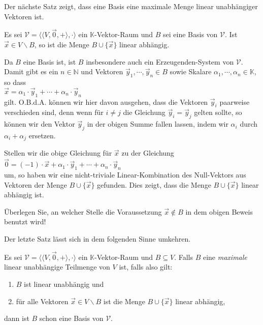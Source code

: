 \noindent
Der n\"{a}chste Satz zeigt, dass eine Basis eine {\color{red}maximale} Menge linear unabh\"{a}ngiger Vektoren ist.

\begin{Satz}
  Es sei $\mathcal{V} = \bigl\langle \langle V, \vec{0}, + \rangle, \cdot \bigr\rangle$ 
  ein $\mathbb{K}$-Vektor-Raum und $B$ sei eine Basis von $\mathcal{V}$.  Ist $\vec{x} \in V \backslash B$,
  so ist die Menge $B \cup \{ \vec{x} \}$ linear abh\"{a}ngig.
\end{Satz}

\proof
Da $B$ eine Basis ist, ist $B$ insbesondere auch ein Erzeugenden-System von $\mathcal{V}$.  Damit gibt es ein
$n \in \mathbb{N}$ und Vektoren $\vec{y}_1,\cdots,\vec{y}_n \in B$ sowie Skalare $\alpha_1, \cdots,\alpha_n \in \mathbb{K}$,
so dass
\\[0.2cm]
\hspace*{1.3cm}
$\vec{x} = \alpha_1 \cdot \vec{y}_1 + \cdots + \alpha_n \cdot \vec{y}_n$
\\[0.2cm]
gilt.  O.B.d.A. k\"{o}nnen wir hier davon ausgehen, dass die Vektoren $\vec{y}_i$ paarweise
verschieden sind, denn wenn f\"{u}r $i\not= j$ die Gleichung $\vec{y}_i = \vec{y}_j$
gelten sollte, so k\"{o}nnen wir den Vektor $\vec{y}_j$ in der obigen Summe fallen lassen,
indem wir $\alpha_i$ durch $\alpha_i + \alpha_j$ ersetzen.

Stellen wir die obige Gleichung f\"{u}r $\vec{x}$ zu der Gleichung
\\[0.2cm]
\hspace*{1.3cm}
$\vec{0} = (-1) \cdot \vec{x} + \alpha_1 \cdot \vec{y}_1 + \cdots + \alpha_n \cdot \vec{y}_n$
\\[0.2cm]
um, so haben wir eine nicht-triviale Linear-Kombination des Null-Vektors aus Vektoren der Menge 
$B \cup \{ \vec{x} \}$ gefunden.  Dies zeigt, dass die Menge $B \cup \{ \vec{x} \}$ linear abh\"{a}ngig
ist. \qeds

\exercise
\"{U}berlegen Sie, an welcher Stelle die Voraussetzung $\vec{x} \not\in B$ in dem obigen Beweis benutzt wird!
\eox

\noindent
Der letzte Satz l\"{a}sst sich in dem folgenden Sinne umkehren.

\begin{Satz}
  Es sei $\mathcal{V} = \bigl\langle \langle V, \vec{0}, + \rangle, \cdot \bigr\rangle$ ein $\mathbb{K}$-Vektor-Raum 
  und $B \subseteq V$.  Falls $B$ eine \emph{\color{blue}maximale} linear 
  unabh\"{a}ngige Teilmenge von $V$ ist, falls also gilt:
  \begin{enumerate}
  \item $B$ ist linear unabh\"{a}ngig und
  \item f\"{u}r alle Vektoren $\vec{x} \in V \backslash B$ ist die Menge $B \cup \{ \vec{x} \}$
        linear abh\"{a}ngig,
  \end{enumerate}
  dann ist $B$ schon eine Basis von $\mathcal{V}$.
\end{Satz}

